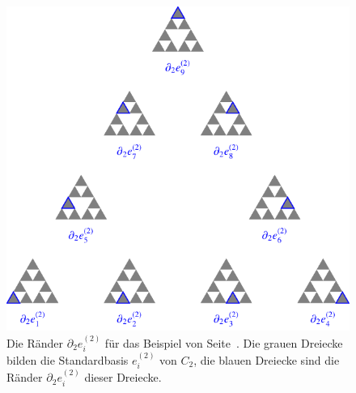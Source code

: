 \begin{figure}
\centering
\includegraphics{chapters/95-homologie/images/homoboundaries.pdf}
\caption{Die Ränder $\partial_2e_i^{(2)}$ für das Beispiel von
Seite~\pageref{buch:homologie:beispiel:gausshomo}.
Die grauen Dreiecke bilden die Standardbasis $e_i^{(2)}$ von $C_2$,
die blauen Dreiecke sind die Ränder $\partial_2e_i^{(2)}$ dieser
Dreiecke.
\label{buch:homologie:fig:homoboundaries}}
\end{figure}

